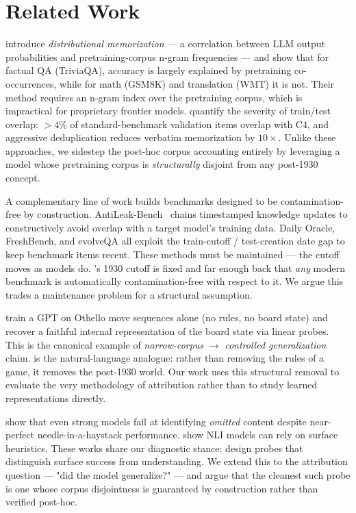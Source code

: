 \section{Related Work}
\label{sec:related}

\citet{wang2025generalization} introduce \emph{distributional memorization} --- a correlation between LLM output probabilities and pretraining-corpus n-gram frequencies --- and show that for factual QA (TriviaQA), accuracy is largely explained by pretraining co-occurrences, while for math (GSM8K) and translation (WMT) it is not. Their method requires an n-gram index over the pretraining corpus, which is impractical for proprietary frontier models. \citet{lee2021deduplicating} quantify the severity of train/test overlap: $>4\%$ of standard-benchmark validation items overlap with C4, and aggressive deduplication reduces verbatim memorization by $10\times$. Unlike these approaches, we sidestep the post-hoc corpus accounting entirely by leveraging a model whose pretraining corpus is \emph{structurally} disjoint from any post-1930 concept.

A complementary line of work builds benchmarks designed to be contamination-free by construction. AntiLeak-Bench~\citep{wu2024antileak} chains timestamped knowledge updates to constructively avoid overlap with a target model's training data. Daily Oracle, FreshBench, and evolveQA all exploit the train-cutoff / test-creation date gap to keep benchmark items recent. These methods must be maintained --- the cutoff moves as models do. \talkienineteen's 1930 cutoff is fixed and far enough back that \emph{any} modern benchmark is automatically contamination-free with respect to it. We argue this trades a maintenance problem for a structural assumption.

\citet{li2023othello} train a GPT on Othello move sequences alone (no rules, no board state) and recover a faithful internal representation of the board state via linear probes. This is the canonical example of \emph{narrow-corpus} $\to$ \emph{controlled generalization} claim. \talkienineteen is the natural-language analogue: rather than removing the rules of a game, it removes the post-1930 world. Our work uses this structural removal to evaluate the very methodology of attribution rather than to study learned representations directly.

\citet{fu2025absencebench} show that even strong models fail at identifying \emph{omitted} content despite near-perfect needle-in-a-haystack performance. \citet{mccoy2019hans} show NLI models can rely on surface heuristics. These works share our diagnostic stance: design probes that distinguish surface success from understanding. We extend this to the attribution question --- "did the model generalize?" --- and argue that the cleanest such probe is one whose corpus disjointness is guaranteed by construction rather than verified post-hoc.

